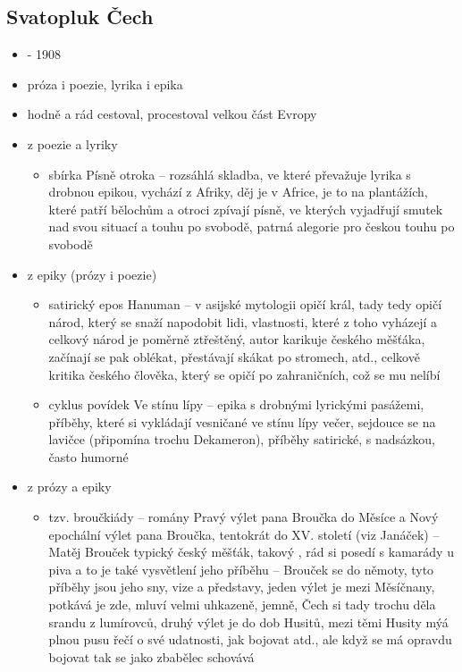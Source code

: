 \documentclass{article}
\begin{document}
\subsection{Svatopluk Čech}
\begin{itemize}
  \item - 1908
  \item próza i poezie, lyrika i epika
  \item hodně a rád cestoval, procestoval velkou část Evropy
  \item z poezie a lyriky
  \begin{itemize}
    \item sbírka Písně otroka -- rozsáhlá skladba, ve které převažuje lyrika s drobnou epikou, vychází z Afriky, děj je v Africe, je to na plantážích, které patří bělochům a otroci zpívají písně, ve kterých vyjadřují smutek nad svou situací a touhu po svobodě, patrná alegorie pro českou touhu po svobodě
  \end{itemize}
  \item z epiky (prózy i poezie)
  \begin{itemize}
    \item satirický epos Hanuman -- v asijské mytologii opičí král, tady tedy opičí národ, který se snaží napodobit lidi, vlastnosti, které z toho vyházejí a celkový národ je poměrně ztřeštěný, autor karikuje českého měšťáka, začínají se pak oblékat, přestávají skákat po stromech, atd., celkově kritika českého člověka, který se  opičí po zahraničních, což se mu nelíbí
    \item cyklus povídek Ve stínu lípy -- epika s drobnými lyrickými pasážemi, příběhy, které si vykládají vesničané ve stínu lípy večer, sejdouce se na lavičce (připomína trochu Dekameron), příběhy satirické, s nadsázkou, často humorné
  \end{itemize}
  \item z prózy a epiky
  \begin{itemize}
    \item tzv. broučkiády -- romány Pravý výlet pana Broučka do Měsíce a Nový epochální výlet pana Broučka, tentokrát do XV. století (viz Janáček) -- Matěj Brouček typický český měšťák, takový , rád si posedí s kamarády u piva a to je také vysvětlení jeho příběhu -- Brouček se  do němoty, tyto příběhy jsou jeho sny, vize a představy, jeden výlet je mezi Měsíčnany, potkává je zde, mluví velmi uhkazeně, jemně, Čech si tady trochu děla srandu z lumírovců, druhý výlet je do dob Husitů, mezi těmi Husity mýá plnou pusu řečí o své udatnosti, jak bojovat atd., ale když se má opravdu bojovat tak se jako zbabělec schovává
  \end{itemize}
\end{itemize}
\end{document}
